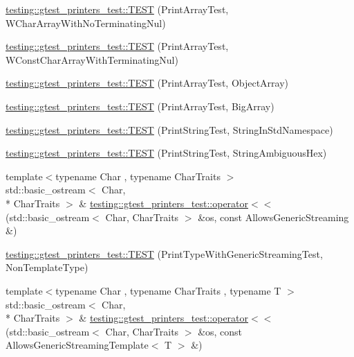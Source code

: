 \begin{DoxyCompactItemize}
\item 
\hyperlink{namespacetesting_1_1gtest__printers__test_ac19ec2732031bfe83b30ea9f00259ef3}{testing\-::gtest\-\_\-printers\-\_\-test\-::\-T\-E\-S\-T} (Print\-Array\-Test, W\-Char\-Array\-With\-No\-Terminating\-Nul)
\item 
\hyperlink{namespacetesting_1_1gtest__printers__test_a6a7cbcdbe748a1d4e90658f48f36c9da}{testing\-::gtest\-\_\-printers\-\_\-test\-::\-T\-E\-S\-T} (Print\-Array\-Test, W\-Const\-Char\-Array\-With\-Terminating\-Nul)
\item 
\hyperlink{namespacetesting_1_1gtest__printers__test_af91d8ad9d6c7547913fe05c7acc44114}{testing\-::gtest\-\_\-printers\-\_\-test\-::\-T\-E\-S\-T} (Print\-Array\-Test, Object\-Array)
\item 
\hyperlink{namespacetesting_1_1gtest__printers__test_a596493b56489aa1571fa26d1402e7116}{testing\-::gtest\-\_\-printers\-\_\-test\-::\-T\-E\-S\-T} (Print\-Array\-Test, Big\-Array)
\item 
\hyperlink{namespacetesting_1_1gtest__printers__test_abbd355e76033f0defd76c37523ad0f60}{testing\-::gtest\-\_\-printers\-\_\-test\-::\-T\-E\-S\-T} (Print\-String\-Test, String\-In\-Std\-Namespace)
\item 
\hyperlink{namespacetesting_1_1gtest__printers__test_ac20ee165500471e363011c3f664d2fb8}{testing\-::gtest\-\_\-printers\-\_\-test\-::\-T\-E\-S\-T} (Print\-String\-Test, String\-Ambiguous\-Hex)
\item 
{\footnotesize template$<$typename Char , typename Char\-Traits $>$ }\\std\-::basic\-\_\-ostream$<$ Char, \\*
Char\-Traits $>$ \& \hyperlink{namespacetesting_1_1gtest__printers__test_a1eb0213095e639d357692066e8505887}{testing\-::gtest\-\_\-printers\-\_\-test\-::operator$<$$<$} (std\-::basic\-\_\-ostream$<$ Char, Char\-Traits $>$ \&os, const Allows\-Generic\-Streaming \&)
\item 
\hyperlink{namespacetesting_1_1gtest__printers__test_a9272037c799c4779e1d79476dad66cb6}{testing\-::gtest\-\_\-printers\-\_\-test\-::\-T\-E\-S\-T} (Print\-Type\-With\-Generic\-Streaming\-Test, Non\-Template\-Type)
\item 
{\footnotesize template$<$typename Char , typename Char\-Traits , typename T $>$ }\\std\-::basic\-\_\-ostream$<$ Char, \\*
Char\-Traits $>$ \& \hyperlink{namespacetesting_1_1gtest__printers__test_a5464168e925b1adf29986c8e544e908e}{testing\-::gtest\-\_\-printers\-\_\-test\-::operator$<$$<$} (std\-::basic\-\_\-ostream$<$ Char, Char\-Traits $>$ \&os, const Allows\-Generic\-Streaming\-Template$<$ T $>$ \&)

\end{DoxyCompactItemize}
